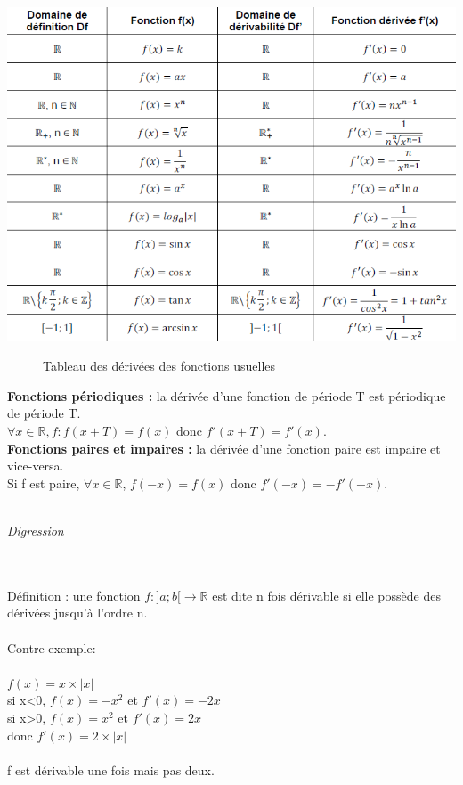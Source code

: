 \documentclass[a4paper,10pt]{book}
\newcommand{\R}{\mathbb{R}}
\begin{document}
\includegraphics[scale=0.58]{images/017.png} \begin{figure}[h] \begin{center} \caption{Tableau des dérivées des fonctions usuelles} \end{center} \end{figure}

\textbf{Fonctions périodiques :} la dérivée d'une fonction de période T est périodique de période T.\\
$\forall x \in \R , f : f(x+T)=f(x)$ donc $f'(x+T)=f'(x)$.\\

\textbf{Fonctions paires et impaires :} la dérivée d'une fonction paire est impaire et vice-versa.\\ 
Si f est paire, $\forall x \in \R$, $f(-x)=f(x)$ donc $f'(-x)=-f'(-x)$. \\ \\

\begin{large} \emph{Digression} \end{large}\\ \\
Définition : une fonction $f : ]a;b[ \longrightarrow \R$ est dite n fois dérivable si elle possède des dérivées jusqu'à l'ordre n.\\ \\
Contre exemple:\\ \\
$f(x)=x\times |x|$\\
si x<0, $f(x)=-x^{2}$ et $f'(x)=-2x$\\
si x>0, $f(x)=x^{2}$ et $f'(x)=2x$\\
donc $f'(x)=2\times |x|$\\ \\
f est dérivable une fois mais pas deux.\\ \\
\end{document}
